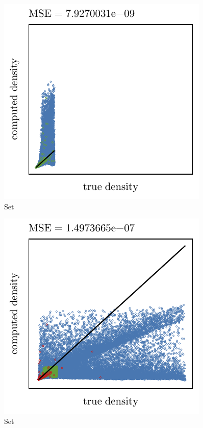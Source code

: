 
\begin{subfigure}{0.3\textwidth}
	\centering
	\includegraphics[keepaspectratio=true, width=\textwidth, height=0.23\textheight]{4/img/results_ferdosi_1_60000_sambe_breiman.pdf}
	\caption{Set \ferdosiOne}
	\label{fig:4:simulated:datasets:sambe:ferdosi1}
\end{subfigure}
\begin{subfigure}{0.3\textwidth}
	\centering
	\includegraphics[keepaspectratio=true, width=\textwidth, height=0.23\textheight]{4/img/results_ferdosi_2_60000_sambe_breiman.pdf}
	\caption{Set \ferdosiTwo}
	\label{fig:4:simulated:datasets:sambe:ferdosi2}
\end{subfigure}	
